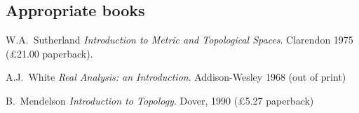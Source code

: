 \documentclass[twoside, numbers=noendperiod]{scrartcl}
\begin{document}
{%



\subsection*{Appropriate books} %
\label{sub:literature}

{\shortskip
W.A.~Sutherland \emph{Introduction to Metric and Topological Spaces}. Clarendon 1975 (£21.00 paperback).

A.J.~White \emph{Real Analysis: an Introduction}. Addison-Wesley 1968 (out of print)

B.~Mendelson \emph{Introduction to Topology}. Dover, 1990 (£5.27 paperback)}

}

\TableofContents


\lecturenotesend
\end{document}
